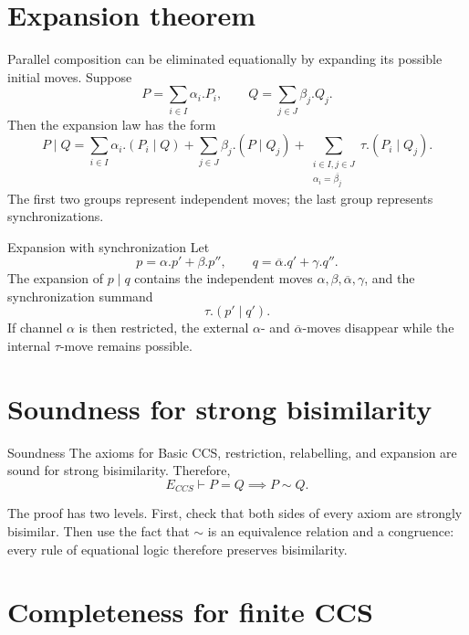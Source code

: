 \documentclass[a4paper]{article}
\begin{document}
\section{Expansion theorem}

Parallel composition can be eliminated equationally by expanding its possible initial moves.
Suppose
\[
    P=\sum_{i\in I}\alpha_i.P_i,
    \qquad
    Q=\sum_{j\in J}\beta_j.Q_j.
\]
Then the expansion law has the form
\[
    P\mid Q
    =
    \sum_{i\in I}\alpha_i.(P_i\mid Q)
    +
    \sum_{j\in J}\beta_j.(P\mid Q_j)
    +
    \sum_{\substack{i\in I,j\in J\\\alpha_i=\overline{\beta_j}}}
        \tau.(P_i\mid Q_j).
\]
The first two groups represent independent moves; the last group represents synchronizations.

\begin{snippetexample}{Expansion with synchronization}
    Let
    \[
        p=\alpha.p'+\beta.p'',
        \qquad
        q=\overline\alpha.q'+\gamma.q''.
    \]
    The expansion of \(p\mid q\) contains the independent moves \(\alpha,\beta,\overline\alpha,\gamma\), and the synchronization summand
    \[
        \tau.(p'\mid q').
    \]
    If channel \(\alpha\) is then restricted, the external \(\alpha\)- and \(\overline\alpha\)-moves disappear while the internal \(\tau\)-move remains possible.
\end{snippetexample}

\section{Soundness for strong bisimilarity}

\begin{snippettheorem}{Soundness}
    The axioms for Basic CCS, restriction, relabelling, and expansion are sound for strong bisimilarity.
    Therefore,
    \[
        E_{CCS}\vdash P=Q
        \implies
        P\sim Q.
    \]
\end{snippettheorem}

The proof has two levels.
First, check that both sides of every axiom are strongly bisimilar.
Then use the fact that \(\sim\) is an equivalence relation and a congruence: every rule of equational logic therefore preserves bisimilarity.

\section{Completeness for finite CCS}
\end{document}
